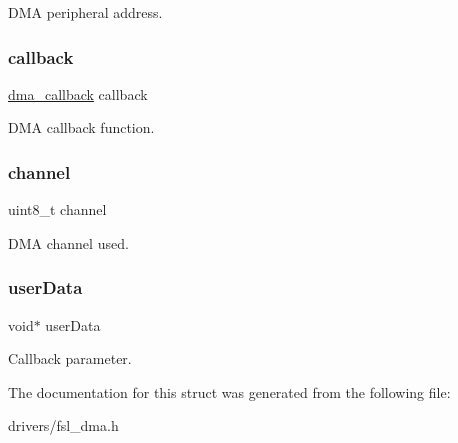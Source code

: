 D\+MA peripheral address. \mbox{\label{struct__dma__handle_a349f4bafd76816e0efc7bf63284e6efe}} 
\subsubsection{\texorpdfstring{callback}{callback}}
{\footnotesize\ttfamily \mbox{\hyperlink{group__dma_gab03f33ad69a5875d025f941419247123}{dma\+\_\+callback}} callback}

D\+MA callback function. \mbox{\label{struct__dma__handle_a715f5cb061d11eb75981741eda4dafcd}} 
\subsubsection{\texorpdfstring{channel}{channel}}
{\footnotesize\ttfamily uint8\+\_\+t channel}

D\+MA channel used. \mbox{\label{struct__dma__handle_a2e294dd14122c554baa0665072b4ca7a}} 
\subsubsection{\texorpdfstring{userData}{userData}}
{\footnotesize\ttfamily void$\ast$ user\+Data}

Callback parameter. 

The documentation for this struct was generated from the following file\+:\begin{DoxyCompactItemize}
\item 
drivers/fsl\+\_\+dma.\+h\end{DoxyCompactItemize}
